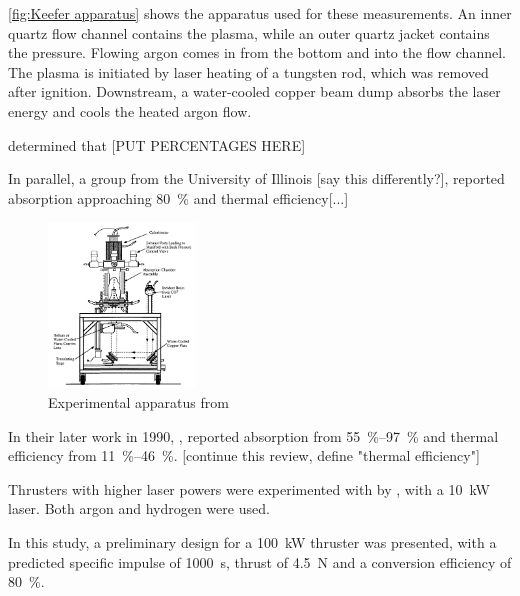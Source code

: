         \autoref{fig:Keefer apparatus} shows the apparatus used for these measurements. An inner quartz flow channel contains the plasma, while an outer quartz jacket contains the pressure. Flowing argon comes in from the bottom and into the flow channel. The plasma is initiated by laser heating of a tungsten rod, which was removed after ignition. Downstream, a water-cooled copper beam dump absorbs the laser energy and cools the heated argon flow.

         determined that [PUT PERCENTAGES HERE]

        In parallel, a group from the University of Illinois [say this differently?], reported absorption approaching \qty{80}{\%} and thermal efficiency[...]

        \begin{figure}[h]
            \centering
            \includegraphics[width=0.35\textwidth]{assets/2 background/Illinois (Krier) Apparatus.png}
            \caption{Experimental apparatus from \textcite{zerkleLasersustainedArgonPlasmas1990}}
            \label{fig:Krier apparatus}
        \end{figure}

        In their later work in 1990, \textcite{zerkleLasersustainedArgonPlasmas1990}, reported absorption from \qtyrange{55}{97}{\%} and thermal efficiency from \qtyrange{11}{46}{\%}. [continue this review, define "thermal efficiency"]


        Thrusters with higher laser powers were experimented with by \textcite{blackLaserPropulsion10kW1995}, with a \qty{10}{kW}  laser. Both argon and hydrogen were used.

        In this study, a preliminary design for a \qty{100}{kW} thruster was presented, with a predicted specific impulse of \qty{1000}{s}, thrust of \qty{4.5}{N} and a conversion efficiency of \qty{80}{\%}.

